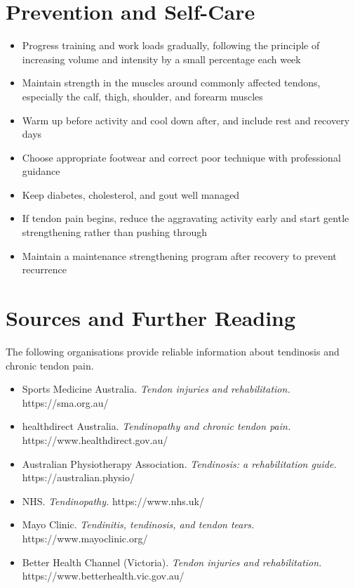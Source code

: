 \section*{Prevention and Self-Care}
\begin{itemize}
    \item Progress training and work loads gradually, following the principle of increasing volume and intensity by a small percentage each week
    \item Maintain strength in the muscles around commonly affected tendons, especially the calf, thigh, shoulder, and forearm muscles
    \item Warm up before activity and cool down after, and include rest and recovery days
    \item Choose appropriate footwear and correct poor technique with professional guidance
    \item Keep diabetes, cholesterol, and gout well managed
    \item If tendon pain begins, reduce the aggravating activity early and start gentle strengthening rather than pushing through
    \item Maintain a maintenance strengthening program after recovery to prevent recurrence
\end{itemize}

\section*{Sources and Further Reading}
The following organisations provide reliable information about tendinosis and chronic tendon pain.

\begin{itemize}
    \item Sports Medicine Australia. \textit{Tendon injuries and rehabilitation.} https://sma.org.au/
    \item healthdirect Australia. \textit{Tendinopathy and chronic tendon pain.} https://www.healthdirect.gov.au/
    \item Australian Physiotherapy Association. \textit{Tendinosis: a rehabilitation guide.} https://australian.physio/
    \item NHS. \textit{Tendinopathy.} https://www.nhs.uk/
    \item Mayo Clinic. \textit{Tendinitis, tendinosis, and tendon tears.} https://www.mayoclinic.org/
    \item Better Health Channel (Victoria). \textit{Tendon injuries and rehabilitation.} https://www.betterhealth.vic.gov.au/
\end{itemize}

\clearpage
